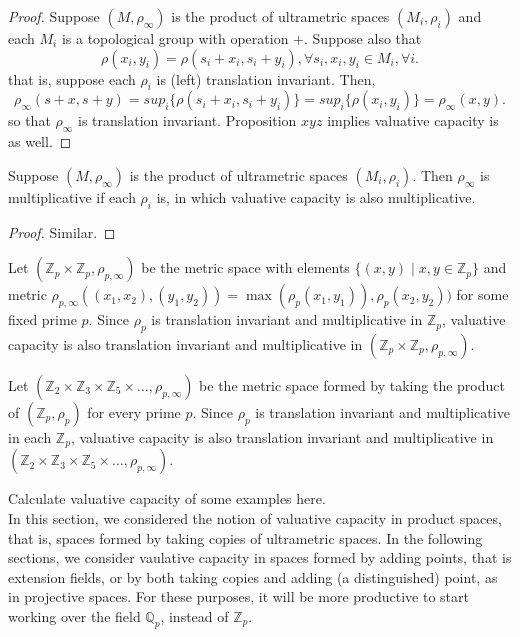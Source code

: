 \begin{proof}
Suppose $(M,\rho_\infty)$ is the product of ultrametric spaces $(M_i, \rho_i)$ and each $M_i$ is a topological group with operation $+$. Suppose also that \[\rho(x_i,y_i) = \rho(s_i + x_i, s_i +y_i), \forall s_i, x_i, y_i \in M_i, \forall i.\] that is, suppose each $\rho_i$ is (left) translation invariant. Then,  
\[
\rho_\infty(s +x, s+y)  
= sup_i\{\rho(s_i +x_i, s_i + y_i)\} 
= sup_i\{\rho(x_i, y_i)\}
= \rho_\infty(x,y).
\] so that $\rho_\infty$ is translation invariant.  Proposition $xyz$ implies valuative capacity is as well. 
\end{proof}


\begin{proposition*}
Suppose $(M,\rho_\infty)$ is the product of ultrametric spaces $(M_i, \rho_i)$. Then $\rho_\infty$ is multiplicative if each $\rho_i$ is, in which valuative capacity is also multiplicative.
\end{proposition*}

\begin{proof}
Similar.
\end{proof}

\begin{example}
	Let $(\mathbb{Z}_p \times \mathbb{Z}_p, \rho_{p,\infty})$ be the metric space with elements $\{(x,y)\mid x,y \in \mathbb{Z}_p\}$ and metric $\rho_{p,\infty}((x_1,x_2), (y_1,y_2)) = \max(\rho_p(x_1, y_1)), \rho_p(x_2, y_2))$ for some fixed prime $p$. Since $\rho_p$ is translation invariant and multiplicative in $\mathbb{Z}_p$, valuative capacity is also translation invariant and multiplicative in  $(\mathbb{Z}_p \times \mathbb{Z}_p, \rho_{p,\infty})$.
\end{example}


\begin{example}
	Let $(\mathbb{Z}_2 \times \mathbb{Z}_3 \times \mathbb{Z}_5 \times \ldots, \rho_{p,\infty})$ be the metric space formed by taking the product of $(\mathbb{Z}_p, \rho_p)$ for every prime $p$. Since $\rho_p$ is translation invariant and multiplicative in each $\mathbb{Z}_p$, valuative capacity is also translation invariant and multiplicative in  $(\mathbb{Z}_2 \times \mathbb{Z}_3 \times \mathbb{Z}_5 \times \ldots, \rho_{p,\infty})$.
\end{example}

Calculate valuative capacity of some examples here.\\


In this section, we considered the notion of valuative capacity in product spaces, that is, spaces formed by taking copies of ultrametric spaces. In the following sections, we consider  vaulative capacity in spaces formed by adding points, that is extension fields, or by both taking copies and adding (a distinguished) point, as in projective spaces. For these purposes, it will be more productive to start working over the field $\mathbb{Q}_p$, instead of $\mathbb{Z}_p$.
